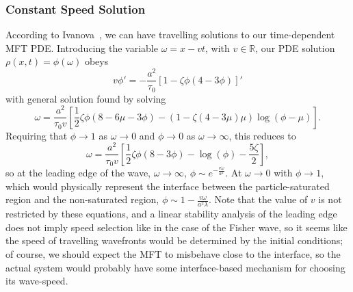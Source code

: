\subsubsection{Constant Speed Solution}
According to Ivanova~\cite{ivanova2007}, we can have travelling solutions to our time-dependent MFT PDE. Introducing the variable $\omega = x - vt$, with $v\in \mathbb{R}$, our PDE solution $\rho(x, t) = \phi(\omega)$ obeys
\begin{equation}
 v \phi ' = -\frac{a^2}{\tau_0} \left[ 1-\zeta \phi \left(4-3\phi\right) \right] '
\end{equation}
with general solution found by solving
\begin{equation}
 \omega = \frac{a^2}{\tau_0 v} \left[ \frac{1}{2} \zeta \phi \left(8-6\mu-3\phi\right) - \left(1-\zeta\left(4-3\mu\right)\mu\right) \log{\left(\phi-\mu\right)} \right].
\end{equation}
Requiring that $\phi \rightarrow  1$ as $\omega \rightarrow 0$ and $\phi \rightarrow 0$ as $\omega \rightarrow \infty$, this reduces to
\begin{equation}
 \omega = \frac{a^2}{\tau_0 v} \left[ \frac{1}{2} \zeta \phi \left(8-3\phi\right) - \log{\left(\phi\right)} - \frac{5 \zeta}{2} \right],
\end{equation}
so at the leading edge of the wave, $\omega \rightarrow \infty$, $\phi \sim e^{-\frac{v \omega}{a^2}} $. At $\omega \rightarrow 0$ with $\phi \rightarrow 1$, which would physically represent the interface between the particle-saturated
region and the non-saturated region, $\phi \sim 1 - \frac{v \omega}{a^2 \lambda}$. Note that the value of $v$ is not restricted by these equations, and a linear stability analysis of the leading edge does not imply speed selection like in
the case of the Fisher wave\cite{sherratt1998transition}, so it seems like the speed of travelling wavefronts would be determined by the initial conditions; of course, we should expect the MFT to misbehave close to the interface,
so the actual system would probably have some interface-based mechanism for choosing its wave-speed.
